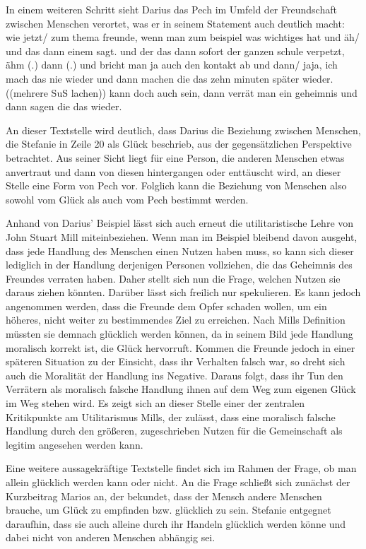 In einem weiteren Schritt sieht Darius das Pech im Umfeld der Freundschaft zwischen Menschen verortet, was er in seinem Statement auch deutlich macht: 
\glqq wie jetzt/ zum thema freunde, wenn man zum beispiel was wichtiges hat und äh/ und das dann einem sagt. und der das dann sofort der ganzen schule verpetzt, ähm (.) dann (.) und bricht man ja auch den kontakt ab und dann/ jaja, ich mach das nie wieder und dann machen die das zehn minuten später wieder. ((mehrere SuS lachen)) kann doch auch sein, dann verrät man ein geheimnis und dann sagen die das wieder.\grqq{}

An dieser Textstelle wird deutlich, dass Darius die Beziehung zwischen Menschen, die Stefanie in Zeile 20 als Glück beschrieb, aus der gegensätzlichen Perspektive betrachtet. 
Aus seiner Sicht liegt für eine Person, die anderen Menschen etwas anvertraut und dann von diesen hintergangen oder enttäuscht wird, an dieser Stelle eine Form von Pech vor. 
Folglich kann die Beziehung von Menschen also sowohl vom Glück als auch vom Pech bestimmt werden. 

Anhand von Darius' Beispiel lässt sich auch erneut die utilitaristische Lehre von John Stuart Mill miteinbeziehen. 
Wenn man im Beispiel bleibend davon ausgeht, dass jede Handlung des Menschen einen Nutzen haben muss, so kann sich dieser lediglich in der Handlung derjenigen Personen vollziehen, die das Geheimnis des Freundes verraten haben. 
Daher stellt sich nun die Frage, welchen Nutzen sie daraus ziehen könnten. 
Darüber lässt sich freilich nur spekulieren. 
Es kann jedoch angenommen werden, dass die Freunde dem Opfer schaden wollen, um ein höheres, nicht weiter zu bestimmendes Ziel zu erreichen. 
Nach Mills Definition müssten sie demnach glücklich werden können, da in seinem Bild jede Handlung moralisch korrekt ist, die Glück hervorruft. 
Kommen die Freunde jedoch in einer späteren Situation zu der Einsicht, dass ihr Verhalten falsch war, so dreht sich auch die Moralität der Handlung ins Negative. 
Daraus folgt, dass ihr Tun den Verrätern als moralisch falsche Handlung ihnen auf dem Weg zum eigenen Glück im Weg stehen wird. 
Es zeigt sich an dieser Stelle einer der zentralen Kritikpunkte am Utilitarismus Mills, der zulässt, dass eine moralisch falsche Handlung durch den größeren, zugeschrieben Nutzen für die Gemeinschaft als legitim angesehen werden kann.

Eine weitere aussagekräftige Textstelle findet sich im Rahmen der Frage, ob man allein glücklich werden kann oder nicht.
 An die Frage schließt sich zunächst der Kurzbeitrag Marios an, der bekundet, dass der Mensch andere Menschen brauche, um Glück zu empfinden bzw. glücklich zu sein. 
 Stefanie entgegnet daraufhin, dass sie auch alleine durch ihr Handeln glücklich werden könne und dabei nicht von anderen Menschen abhängig sei.
 
